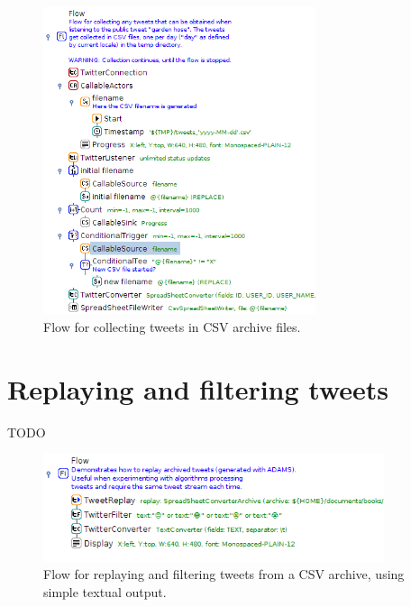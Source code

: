 \documentclass[a4paper,10pt]{book}
\begin{document}
\begin{figure}[htb]
  \centering
  \includegraphics[width=8.0cm]{images/collect_tweets-flow.png}
  \caption{Flow for collecting tweets in CSV archive files.}
  \label{collect_tweets-flow}
\end{figure}

\clearpage
\newpage
\section{Replaying and filtering tweets}
TODO

\begin{figure}[htb]
  \centering
  \includegraphics[width=10.0cm]{images/replay_and_filter_tweets-flow.png}
  \caption{Flow for replaying and filtering tweets from a CSV archive, using simple textual output.}
  \label{replay_and_filter_tweets-flow}
\end{figure}
\end{document}
